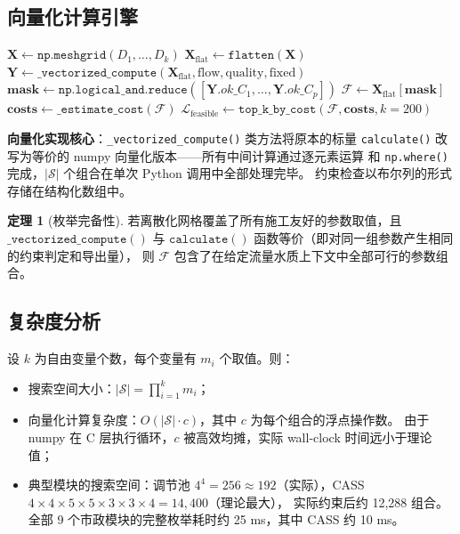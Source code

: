 \documentclass[12pt,a4paper]{ctexart}
\theoremstyle{definition}
\newtheorem{theorem}{定理}[section]
\theoremstyle{remark}
\begin{document}
\subsection{向量化计算引擎}

\begin{algorithm}[htbp]
\caption{向量化可行域枚举（\texttt{SolutionSpace.enumerate()}, 行 91--160）}
\label{alg:enumerate}
\BlankLine
$\mathbf{X} \gets \texttt{np.meshgrid}(D_1, \ldots, D_k)$ 
\;
$\mathbf{X}_{\text{flat}} \gets \texttt{flatten}(\mathbf{X})$ 
\;
$\mathbf{Y} \gets \texttt{\_vectorized\_compute}(\mathbf{X}_{\text{flat}}, \text{flow}, \text{quality}, \text{fixed})$
\;
$\mathbf{mask} \gets \texttt{np.logical\_and.reduce}([\mathbf{Y}.ok\_C_1, \ldots, \mathbf{Y}.ok\_C_p])$
\;
$\mathcal{F} \gets \mathbf{X}_{\text{flat}}[\mathbf{mask}]$ 
\;
$\mathbf{costs} \gets \texttt{\_estimate\_cost}(\mathcal{F})$ 
\;
$\mathcal{L}_{\text{feasible}} \gets \texttt{top\_k\_by\_cost}(\mathcal{F}, \mathbf{costs}, k=200)$
\;
\;
\end{algorithm}

\textbf{向量化实现核心}：\texttt{\_vectorized\_compute()} 类方法将原本的标量
\texttt{calculate()} 改写为等价的 numpy 向量化版本——所有中间计算通过逐元素运算
和 \texttt{np.where()} 完成，$|\mathcal{S}|$ 个组合在单次 Python 调用中全部处理完毕。
约束检查以布尔列的形式存储在结构化数组中。

\begin{theorem}[枚举完备性]
\label{thm:enum-complete}
若离散化网格覆盖了所有施工友好的参数取值，且 $\texttt{\_vectorized\_compute}()$ 与
$\texttt{calculate}()$ 函数等价（即对同一组参数产生相同的约束判定和导出量），
则 $\mathcal{F}$ 包含了在给定流量水质上下文中全部可行的参数组合。
\end{theorem}

\subsection{复杂度分析}

设 $k$ 为自由变量个数，每个变量有 $m_i$ 个取值。则：
\begin{itemize}
  \item 搜索空间大小：$|\mathcal{S}| = \prod_{i=1}^k m_i$；
  \item 向量化计算复杂度：$O(|\mathcal{S}| \cdot c)$，其中 $c$ 为每个组合的浮点操作数。
        由于 numpy 在 C 层执行循环，$c$ 被高效均摊，实际 wall-clock 时间远小于理论值；
  \item 典型模块的搜索空间：调节池 $4^4 = 256 \approx 192$（实际），CASS $4 \times 4 \times 5 \times 5 \times 3 \times 3 \times 4 = 14,400$（理论最大），
        实际约束后约 12,288 组合。全部 9 个市政模块的完整枚举耗时约 25 ms，其中 CASS 约 10 ms。
\end{itemize}
\end{document}
